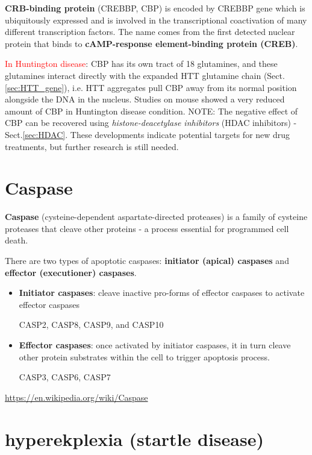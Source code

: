 {\bf CRB-binding protein} (CREBBP, CBP) is encoded by CREBBP gene which is 
ubiquitously expressed and is involved in the transcriptional coactivation of
many different transcription factors.
The name comes from the first detected nuclear protein that binds to
{\bf cAMP-response element-binding protein (CREB)}.


\textcolor{red}{In Huntington disease}: CBP has its own tract of 18 glutamines,
and these glutamines interact directly with the expanded HTT glutamine chain
(Sect.\ref{sec:HTT_gene}), i.e.
HTT aggregates pull CBP away from its normal position alongside the DNA in the
nucleus. Studies on mouse showed a very reduced amount of CBP in Huntington
disease condition. NOTE: The negative effect of CBP can be recovered using {\it
histone-deacetylase inhibitors} (HDAC inhibitors) - Sect.\ref{sec:HDAC}. These
developments indicate potential targets for new drug treatments, but further
research is still needed.

\section{Caspase}
\label{sec:caspase}

{\bf Caspase} (cysteine-dependent aspartate-directed proteases)
is a family of cysteine proteases that cleave other proteins - a process
essential for programmed cell death.

There are two types of apoptotic caspases: {\bf initiator (apical) caspases} and
{\bf effector (executioner) caspases}.
\begin{itemize}
  \item {\bf Initiator caspases}: cleave inactive pro-forms of effector caspases
  to activate effector caspases
  
  CASP2, CASP8, CASP9, and CASP10
  
  \item {\bf Effector caspases}: once activated by initiator caspases, it
  in turn cleave other protein substrates within the cell to trigger apoptosis
  process.
  
   CASP3, CASP6, CASP7
\end{itemize}

\url{https://en.wikipedia.org/wiki/Caspase}

\section{hyperekplexia (startle disease)}
\label{sec:hyperkplexia}
\label{sec:startle-disease}

